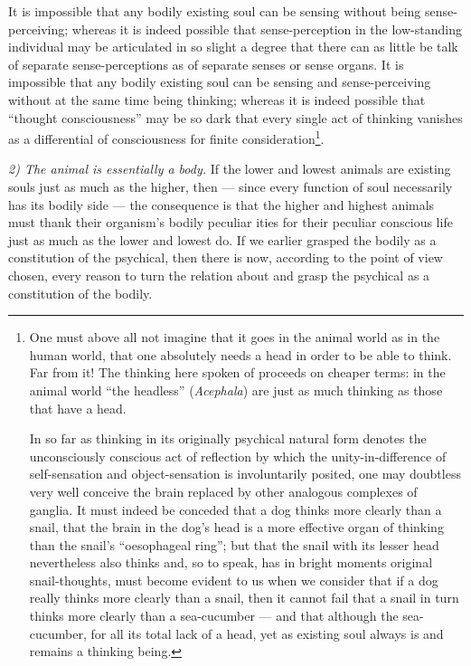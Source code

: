 \documentclass[12pt,a4paper]{book}
\begin{document}
\setcounter{footnote}{0}
It is impossible that any bodily existing soul can be sensing without being
sense-perceiving; whereas it is indeed possible that sense-perception in the
low-standing individual may be articulated in so slight a degree that there can as
little be talk of separate sense-perceptions as of separate senses or sense organs. It
is impossible that any bodily existing soul can be sensing and sense-perceiving
without at the same time being thinking; whereas it is indeed possible that ``thought
consciousness'' may be so dark that every single act of thinking vanishes as a
differential of consciousness for finite consideration\footnote{One must above all not
imagine that it goes in the animal world as in the human world, that one absolutely
needs a head in order to be able to think. Far from it! The thinking here spoken of
proceeds on cheaper terms: in the animal world ``the headless'' (\textit{Acephala})
are just as much thinking as those that have a head.
\par In so far as thinking in its originally psychical natural form denotes the
unconsciously conscious act of reflection by which the unity-in-difference of
self-sensation and object-sensation is involuntarily posited, one may doubtless very
well conceive the brain replaced by other analogous complexes of ganglia. It must
indeed be conceded that a dog thinks more clearly than a snail, that the brain in the
dog's head is a more effective organ of thinking than the snail's ``oesophageal
ring''; but that the snail with its lesser head nevertheless also thinks and, so to
speak, has in bright moments original snail-thoughts, must become evident to us when
we consider that if a dog really thinks more clearly than a snail, then it cannot fail
that a snail in turn thinks more clearly than a sea-cucumber --- and that although the
sea-cucumber, for all its total lack of a head, yet as existing soul always is and
remains a thinking being.}.

\emph{2) The animal is essentially a body.} If the lower and lowest animals are
existing souls just as much as the higher, then --- since every function of soul
necessarily has its bodily side --- the consequence is that the higher and highest
animals must thank their organism's bodily peculiar%
ities for their peculiar conscious life just as much as the lower and lowest do. If we
earlier grasped the bodily as a constitution of the psychical, then there is now,
according to the point of view chosen, every reason to turn the relation about and
grasp the psychical as a constitution of the bodily.
\end{document}
